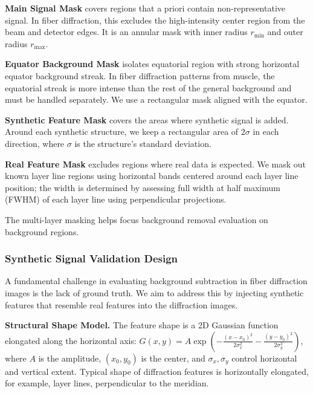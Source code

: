 \documentclass[iucr,review]{iucrjournals}
\begin{document}
\textbf{Main Signal Mask} covers regions that a priori contain non-representative signal.
In fiber diffraction, this excludes the high-intensity center region from the beam and detector edges. It is an annular mask with
inner radius $r_{\mathrm{min}}$ and outer radius $r_{\mathrm{max}}$.

\textbf{Equator Background Mask} isolates equatorial region with strong horizontal equator background streak. 
In fiber diffraction patterns from muscle, the equatorial streak is more intense than
the rest of the general background and must be handled separately.
We use a rectangular mask aligned with the equator.


\textbf{Synthetic Feature Mask} covers the areas where synthetic signal is added. Around each synthetic structure, we keep a rectangular area
of $2 \sigma$ in each direction, where $\sigma$ is the structure's standard deviation.

\textbf{Real Feature Mask} excludes regions where real data is expected. 
We mask out known layer line regions using horizontal bands centered around each layer line position; the width is determined
by assessing full width at half maximum (FWHM) of each layer line using perpendicular projections. 

The multi-layer masking helps focus background removal evaluation on background regions.


\subsubsection{Synthetic Signal Validation Design}

A fundamental challenge in evaluating background subtraction in fiber diffraction images is the lack of ground truth.
We aim to address this by injecting synthetic features that resemble real features into the diffraction images.


\textbf{Structural Shape Model.}
The feature shape is a 2D Gaussian function elongated along the horizontal axis:
$G(x, y) = A \exp(- \frac{(x-x_0)^2}{2\sigma_x^2} - \frac{(y-y_0)^2}{2\sigma_y^2} )$,
where 
$A$ is the amplitude, $(x_0, y_0)$ is the center, and $\sigma_x, \sigma_y$ control horizontal and vertical extent.
Typical shape of diffraction features is horizontally elongated, for example, layer lines, perpendicular to the meridian.
\end{document}
